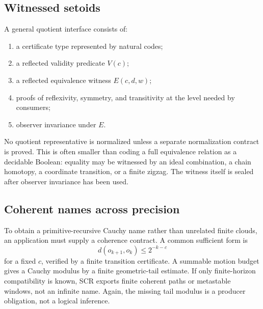 \subsection{Witnessed setoids}

A general quotient interface consists of:
\begin{enumerate}[label=(\alph*)]
\item a certificate type represented by natural codes;
\item a reflected validity predicate \(V(c)\);
\item a reflected equivalence witness \(E(c,d,w)\);
\item proofs of reflexivity, symmetry, and transitivity at the level needed by
      consumers;
\item observer invariance under \(E\).
\end{enumerate}
No quotient representative is normalized unless a separate normalization
contract is proved.  This is often smaller than coding a full equivalence
relation as a decidable Boolean: equality may be witnessed by an ideal
combination, a chain homotopy, a coordinate transition, or a finite zigzag.
The witness itself is sealed after observer invariance has been used.

\subsection{Coherent names across precision}

To obtain a primitive-recursive Cauchy name rather than unrelated finite
clouds, an application must supply a coherence contract.  A common sufficient
form is
\[
  d(o_{k+1},o_k)\le 2^{-k-c}
\]
for a fixed \(c\), verified by a finite transition certificate.  A summable
motion budget gives a Cauchy modulus by a finite geometric-tail estimate.  If
only finite-horizon compatibility is known, SCR exports finite coherent paths
or metastable windows, not an infinite name.  Again, the missing tail modulus
is a producer obligation, not a logical inference.
